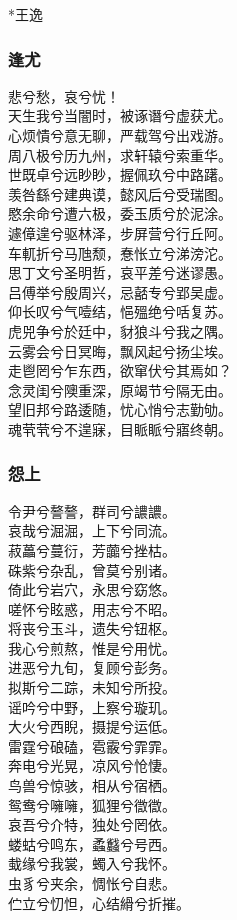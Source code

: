 \documentclass[]{article}
\begin{document}
*王逸

\hypertarget{header-n3131}{%
\subsubsection{逢尤}\label{header-n3131}}

悲兮愁，哀兮忧！\\
天生我兮当闇时，被诼谮兮虚获尤。\\
心烦憒兮意无聊，严载驾兮出戏游。\\
周八极兮历九州，求轩辕兮索重华。\\
世既卓兮远眇眇，握佩玖兮中路躇。\\
羡咎繇兮建典谟，懿风后兮受瑞图。\\
愍余命兮遭六极，委玉质兮於泥涂。\\
遽傽遑兮驱林泽，步屏营兮行丘阿。\\
车軏折兮马虺颓，惷怅立兮涕滂沱。\\
思丁文兮圣明哲，哀平差兮迷谬愚。\\
吕傅举兮殷周兴，忌嚭专兮郢吴虚。\\
仰长叹兮气噎结，悒殟绝兮咶复苏。\\
虎兕争兮於廷中，豺狼斗兮我之隅。\\
云雾会兮日冥晦，飘风起兮扬尘埃。\\
走鬯罔兮乍东西，欲窜伏兮其焉如？\\
念灵闺兮隩重深，原竭节兮隔无由。\\
望旧邦兮路逶随，忧心悄兮志勤劬。\\
魂茕茕兮不遑寐，目眽眽兮寤终朝。

\hypertarget{header-n3136}{%
\subsubsection{怨上}\label{header-n3136}}

令尹兮謷謷，群司兮譨譨。\\
哀哉兮淈淈，上下兮同流。\\
菽藟兮蔓衍，芳虈兮挫枯。\\
硃紫兮杂乱，曾莫兮别诸。\\
倚此兮岩穴，永思兮窈悠。\\
嗟怀兮眩惑，用志兮不昭。\\
将丧兮玉斗，遗失兮钮枢。\\
我心兮煎熬，惟是兮用忧。\\
进恶兮九旬，复顾兮彭务。\\
拟斯兮二踪，未知兮所投。\\
谣吟兮中野，上察兮璇玑。\\
大火兮西睨，摄提兮运低。\\
雷霆兮硠磕，雹霰兮霏霏。\\
奔电兮光晃，凉风兮怆悽。\\
鸟兽兮惊骇，相从兮宿栖。\\
鸳鸯兮噰噰，狐狸兮徾徾。\\
哀吾兮介特，独处兮罔依。\\
蝼蛄兮鸣东，蟊蠽兮号西。\\
蛓缘兮我裳，蠋入兮我怀。\\
虫豸兮夹余，惆怅兮自悲。\\
伫立兮忉怛，心结縎兮折摧。
\end{document}
